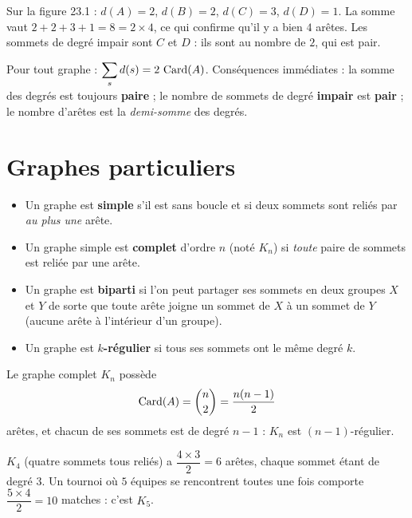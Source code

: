 \begin{exemple}
Sur la figure 23.1 : $d(A)=2$, $d(B)=2$, $d(C)=3$, $d(D)=1$. La somme vaut
$2+2+3+1=8=2\times 4$, ce qui confirme qu'il y a bien $4$ arêtes. Les sommets de degré
impair sont $C$ et $D$ : ils sont au nombre de $2$, qui est pair.
\end{exemple}

\begin{aretenir}
Pour tout graphe : $\displaystyle\sum_{s} d(s)=2\,\operatorname{Card}(A)$. Conséquences immédiates : la somme
des degrés est toujours \textbf{paire} ; le nombre de sommets de degré \textbf{impair} est
\textbf{pair} ; le nombre d'arêtes est la \emph{demi-somme} des degrés.
\end{aretenir}

\section{Graphes particuliers}

\begin{definition}
\begin{itemize}
\item Un graphe est \textbf{simple} s'il est sans boucle et si deux sommets sont reliés
par \emph{au plus une} arête.
\item Un graphe simple est \textbf{complet} d'ordre $n$ (noté $K_n$) si \emph{toute} paire
de sommets est reliée par une arête.
\item Un graphe est \textbf{biparti} si l'on peut partager ses sommets en deux groupes
$X$ et $Y$ de sorte que toute arête joigne un sommet de $X$ à un sommet de $Y$ (aucune
arête à l'intérieur d'un groupe).
\item Un graphe est \textbf{$k$-régulier} si tous ses sommets ont le même degré $k$.
\end{itemize}
\end{definition}

\begin{propriete}
Le graphe complet $K_n$ possède
\[
\operatorname{Card}(A)=\binom{n}{2}=\frac{n(n-1)}{2}
\]
arêtes, et chacun de ses sommets est de degré $n-1$ : $K_n$ est $(n-1)$-régulier.
\end{propriete}

\begin{exemple}
$K_4$ (quatre sommets tous reliés) a $\dfrac{4\times 3}{2}=6$ arêtes, chaque sommet étant
de degré $3$. Un tournoi où $5$ équipes se rencontrent toutes une fois comporte
$\dfrac{5\times 4}{2}=10$ matches : c'est $K_5$.
\end{exemple}


